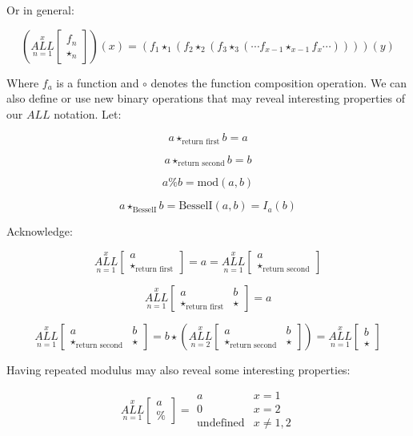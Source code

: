 \documentclass{article}
\begin{document}
Or in general:

$$(\underset{n=1}{\overset{x}{ALL}} \begin{bmatrix}
f_n \\
\star_n
\end{bmatrix}) (x) = (f_1 \star_1 (f_2 \star_2 (f_3 \star_3 (\cdots f_{x-1} \star_{x-1} f_x \cdots))))(y)$$

Where $f_a$ is a function and $\circ$ denotes the function composition operation. We can also define or use new binary operations that may reveal interesting properties of our $ALL$ notation. Let:

$$a \star_{\text{return first}} b = a$$

$$a \star_{\text{return second}} b = b$$

$$a \% b = \text{mod}(a,b)$$

$$a \star_{\text{BesselI}} b = \text{BesselI}(a,b) = I_a(b)$$

Acknowledge:

$$\underset{n=1}{\overset{x}{ALL}} \begin{bmatrix}
a \\
\star_{\text{return first}}
\end{bmatrix} = a = \underset{n=1}{\overset{x}{ALL}} \begin{bmatrix}
a \\
\star_{\text{return second}}
\end{bmatrix}$$

$$\underset{n=1}{\overset{x}{ALL}} \begin{bmatrix}
a & b\\
\star_{\text{return first}} & \star
\end{bmatrix} = a$$

$$\underset{n=1}{\overset{x}{ALL}} \begin{bmatrix}
a & b\\
\star_{\text{return second}} & \star
\end{bmatrix} = b \star (\underset{n=2}{\overset{x}{ALL}} \begin{bmatrix}
a & b\\
\star_{\text{return second}} & \star
\end{bmatrix}) = \underset{n=1}{\overset{x}{ALL}} \begin{bmatrix}
b\\
\star
\end{bmatrix}$$

Having repeated modulus may also reveal some interesting properties:

$$ \underset{n=1}{\overset{x}{ALL}} \begin{bmatrix}
a \\
\%
\end{bmatrix} = \begin{array}{ll} a & x=1 \\ 0 & x=2 \\ \text{undefined} & x \neq 1,2 \end{array} $$
\end{document}
